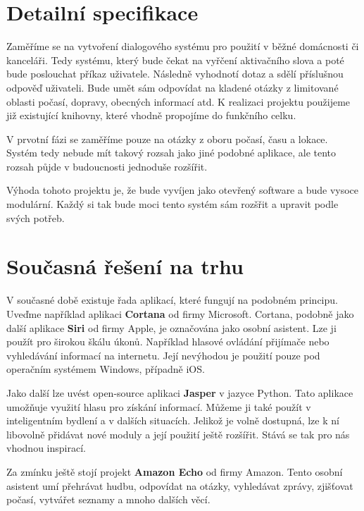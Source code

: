\documentclass[12pt,a4paper]{article}
\begin{document}
\section*{Detailní specifikace}
Zaměříme se na vytvoření dialogového systému pro použití v běžné domácnosti či kanceláři. Tedy systému, který bude čekat na vyřčení aktivačního slova a poté bude poslouchat příkaz uživatele. Následně vyhodnotí dotaz a sdělí příslušnou odpověď uživateli. Bude umět sám odpovídat na kladené otázky z limitované oblasti počasí, dopravy, obecných informací atd. K realizaci projektu použijeme již existující knihovny, které vhodně propojíme do funkčního celku.

V prvotní fázi se zaměříme pouze na otázky z oboru počasí, času a lokace. Systém tedy nebude mít takový rozsah jako jiné podobné aplikace, ale tento rozsah půjde v budoucnosti jednoduše rozšířit.

Výhoda tohoto projektu je, že bude vyvíjen jako otevřený software a bude vysoce modulární. Každý si tak bude moci tento systém sám rozšřit a upravit podle svých potřeb.

\section*{Současná řešení na trhu}
V současné době existuje řada aplikací, které fungují na podobném principu. Uveďme například aplikaci \textbf{Cortana} od firmy Microsoft. Cortana, podobně jako další aplikace \textbf{Siri} od firmy Apple, je označována jako osobní asistent. Lze ji použít pro širokou škálu úkonů. Například hlasové ovládání přijímače nebo vyhledávání informací na internetu. Její nevýhodou je použití pouze pod operačním systémem Windows, případně iOS. 

Jako další lze uvést open-source aplikaci \textbf{Jasper} v jazyce Python. Tato aplikace umožňuje využití hlasu pro získání informací. Můžeme ji také použít v inteligentním bydlení a v dalších situacích. Jelikož je volně dostupná, lze k ní libovolně přidávat nové moduly a její použití ještě rozšířit. Stává se tak pro nás vhodnou inspirací. 

Za zmínku ještě stojí projekt \textbf{Amazon Echo} od firmy Amazon. Tento osobní asistent umí přehrávat hudbu, odpovídat na otázky, vyhledávat zprávy, zjišťovat počasí, vytvářet seznamy a mnoho dalších věcí. 
\end{document}

